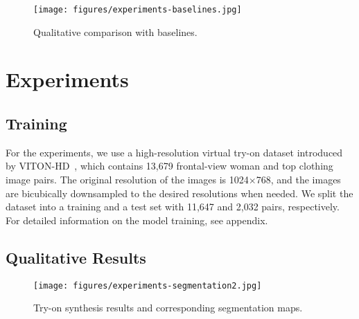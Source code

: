 \begin{figure}[t!]
    \centering
    \texttt{[image: figures/experiments-baselines.jpg]}
    \vspace{-0.5cm}
    \caption{Qualitative comparison with baselines.}
    \vspace{-0.5cm}
    \label{fig:viscomp_img}
\end{figure}


\section{Experiments}

\subsection{Training}


For the experiments, we use a high-resolution virtual try-on dataset introduced by VITON-HD~\cite{choi2021viton}, which contains 13,679 frontal-view woman and top clothing image pairs.
The original resolution of the images is 1024$\times$768, and the images are bicubically downsampled to the desired resolutions when needed.
We split the dataset into a training and a test set with 11,647 and 2,032 pairs, respectively.
For detailed information on the model training, see appendix.






\subsection{Qualitative Results}


\begin{figure}[t!]
    \centering
    \texttt{[image: figures/experiments-segmentation2.jpg]}
    \caption{Try-on synthesis results and corresponding segmentation maps.}
    \label{fig:viscomp_seg}
\end{figure}






